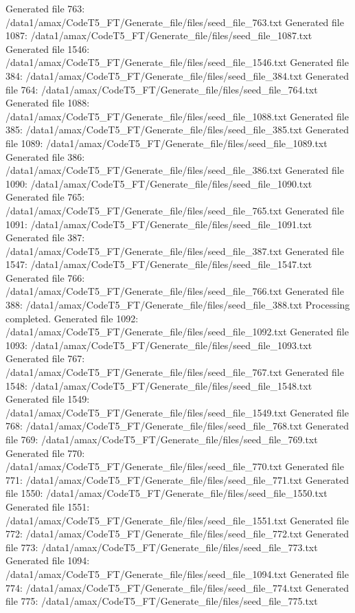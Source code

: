 Generated file 763: /data1/amax/CodeT5_FT/Generate_file/files/seed_file_763.txt
Generated file 1087: /data1/amax/CodeT5_FT/Generate_file/files/seed_file_1087.txt
Generated file 1546: /data1/amax/CodeT5_FT/Generate_file/files/seed_file_1546.txt
Generated file 384: /data1/amax/CodeT5_FT/Generate_file/files/seed_file_384.txt
Generated file 764: /data1/amax/CodeT5_FT/Generate_file/files/seed_file_764.txt
Generated file 1088: /data1/amax/CodeT5_FT/Generate_file/files/seed_file_1088.txt
Generated file 385: /data1/amax/CodeT5_FT/Generate_file/files/seed_file_385.txt
Generated file 1089: /data1/amax/CodeT5_FT/Generate_file/files/seed_file_1089.txt
Generated file 386: /data1/amax/CodeT5_FT/Generate_file/files/seed_file_386.txt
Generated file 1090: /data1/amax/CodeT5_FT/Generate_file/files/seed_file_1090.txt
Generated file 765: /data1/amax/CodeT5_FT/Generate_file/files/seed_file_765.txt
Generated file 1091: /data1/amax/CodeT5_FT/Generate_file/files/seed_file_1091.txt
Generated file 387: /data1/amax/CodeT5_FT/Generate_file/files/seed_file_387.txt
Generated file 1547: /data1/amax/CodeT5_FT/Generate_file/files/seed_file_1547.txt
Generated file 766: /data1/amax/CodeT5_FT/Generate_file/files/seed_file_766.txt
Generated file 388: /data1/amax/CodeT5_FT/Generate_file/files/seed_file_388.txt
Processing completed.
Generated file 1092: /data1/amax/CodeT5_FT/Generate_file/files/seed_file_1092.txt
Generated file 1093: /data1/amax/CodeT5_FT/Generate_file/files/seed_file_1093.txt
Generated file 767: /data1/amax/CodeT5_FT/Generate_file/files/seed_file_767.txt
Generated file 1548: /data1/amax/CodeT5_FT/Generate_file/files/seed_file_1548.txt
Generated file 1549: /data1/amax/CodeT5_FT/Generate_file/files/seed_file_1549.txt
Generated file 768: /data1/amax/CodeT5_FT/Generate_file/files/seed_file_768.txt
Generated file 769: /data1/amax/CodeT5_FT/Generate_file/files/seed_file_769.txt
Generated file 770: /data1/amax/CodeT5_FT/Generate_file/files/seed_file_770.txt
Generated file 771: /data1/amax/CodeT5_FT/Generate_file/files/seed_file_771.txt
Generated file 1550: /data1/amax/CodeT5_FT/Generate_file/files/seed_file_1550.txt
Generated file 1551: /data1/amax/CodeT5_FT/Generate_file/files/seed_file_1551.txt
Generated file 772: /data1/amax/CodeT5_FT/Generate_file/files/seed_file_772.txt
Generated file 773: /data1/amax/CodeT5_FT/Generate_file/files/seed_file_773.txt
Generated file 1094: /data1/amax/CodeT5_FT/Generate_file/files/seed_file_1094.txt
Generated file 774: /data1/amax/CodeT5_FT/Generate_file/files/seed_file_774.txt
Generated file 775: /data1/amax/CodeT5_FT/Generate_file/files/seed_file_775.txt
